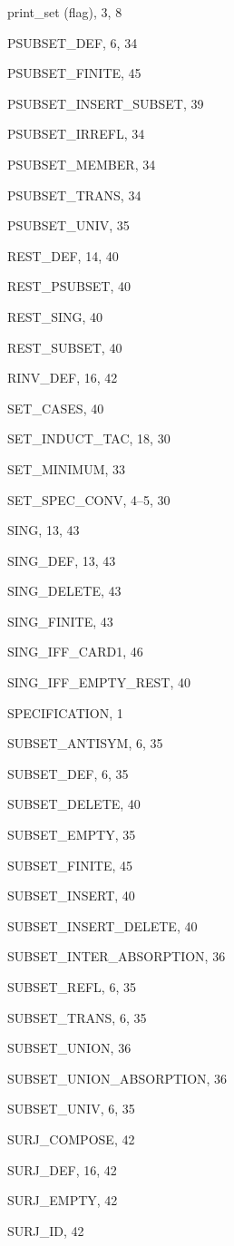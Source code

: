 \begin{theindex}
  \indexspace

  \item {\ptt print\_set} (flag), 3, 8
  \item {\ptt PSUBSET\_DEF}, 6, 34
  \item {\ptt PSUBSET\_FINITE}, 45
  \item {\ptt PSUBSET\_INSERT\_SUBSET}, 39
  \item {\ptt PSUBSET\_IRREFL}, 34
  \item {\ptt PSUBSET\_MEMBER}, 34
  \item {\ptt PSUBSET\_TRANS}, 34
  \item {\ptt PSUBSET\_UNIV}, 35

  \indexspace

  \item {\ptt REST\_DEF}, 14, 40
  \item {\ptt REST\_PSUBSET}, 40
  \item {\ptt REST\_SING}, 40
  \item {\ptt REST\_SUBSET}, 40
  \item {\ptt RINV\_DEF}, 16, 42

  \indexspace

  \item {\ptt SET\_CASES}, 40
  \item {\ptt SET\_INDUCT\_TAC}, 18, 30
  \item {\ptt SET\_MINIMUM}, 33
  \item {\ptt SET\_SPEC\_CONV}, 4--5, 30
  \item {\ptt SING}, 13, 43
  \item {\ptt SING\_DEF}, 13, 43
  \item {\ptt SING\_DELETE}, 43
  \item {\ptt SING\_FINITE}, 43
  \item {\ptt SING\_IFF\_CARD1}, 46
  \item {\ptt SING\_IFF\_EMPTY\_REST}, 40
  \item {\ptt SPECIFICATION}, 1
  \item {\ptt SUBSET\_ANTISYM}, 6, 35
  \item {\ptt SUBSET\_DEF}, 6, 35
  \item {\ptt SUBSET\_DELETE}, 40
  \item {\ptt SUBSET\_EMPTY}, 35
  \item {\ptt SUBSET\_FINITE}, 45
  \item {\ptt SUBSET\_INSERT}, 40
  \item {\ptt SUBSET\_INSERT\_DELETE}, 40
  \item {\ptt SUBSET\_INTER\_ABSORPTION}, 36
  \item {\ptt SUBSET\_REFL}, 6, 35
  \item {\ptt SUBSET\_TRANS}, 6, 35
  \item {\ptt SUBSET\_UNION}, 36
  \item {\ptt SUBSET\_UNION\_ABSORPTION}, 36
  \item {\ptt SUBSET\_UNIV}, 6, 35
  \item {\ptt SURJ\_COMPOSE}, 42
  \item {\ptt SURJ\_DEF}, 16, 42
  \item {\ptt SURJ\_EMPTY}, 42
  \item {\ptt SURJ\_ID}, 42


\end{theindex}
